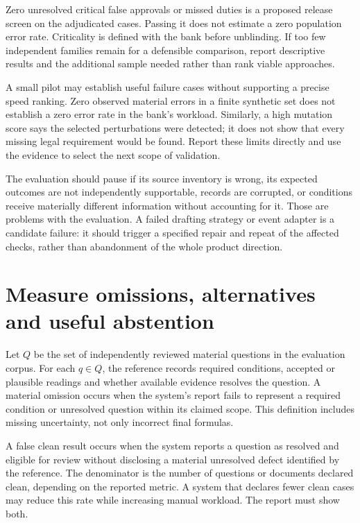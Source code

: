 \documentclass[12pt,a4paper,oneside,openany]{book}
\begin{document}
Zero unresolved critical false approvals or missed duties is a proposed release
screen on the adjudicated cases. Passing it does not estimate a zero population
error rate. Criticality is defined with the bank before unblinding. If too few
independent families remain for a defensible comparison, report descriptive
results and the additional sample needed rather than rank viable approaches.

A small pilot may establish useful failure cases without supporting a precise
speed ranking. Zero observed material errors in a finite synthetic set does not
establish a zero error rate in the bank's workload. Similarly, a high mutation
score says the selected perturbations were detected; it does not show that every
missing legal requirement would be found. Report these limits directly and use
the evidence to select the next scope of validation.

The evaluation should pause if its source inventory is wrong, its expected
outcomes are not independently supportable, records are corrupted, or conditions
receive materially different information without accounting for it. Those are
problems with the evaluation. A failed drafting strategy or event adapter is a
candidate failure: it should trigger a specified repair and repeat of the affected
checks, rather than abandonment of the whole product direction.

\section{Measure omissions, alternatives and useful abstention}
\label{merge:M09:05}


Let $Q$ be the set of independently reviewed material questions in the evaluation
corpus. For each $q\in Q$, the reference records required conditions, accepted or
plausible readings and whether available evidence resolves the question. A
material omission occurs when the system's report fails to represent a required
condition or unresolved question within its claimed scope. This definition
includes missing uncertainty, not only incorrect final formulas.

A false clean result occurs when the system reports a question as resolved and
eligible for review without disclosing a material unresolved defect identified by
the reference. The denominator is the number of questions or documents declared
clean, depending on the reported metric. A system that declares fewer clean cases
may reduce this rate while increasing manual workload. The report must show both.
\end{document}
